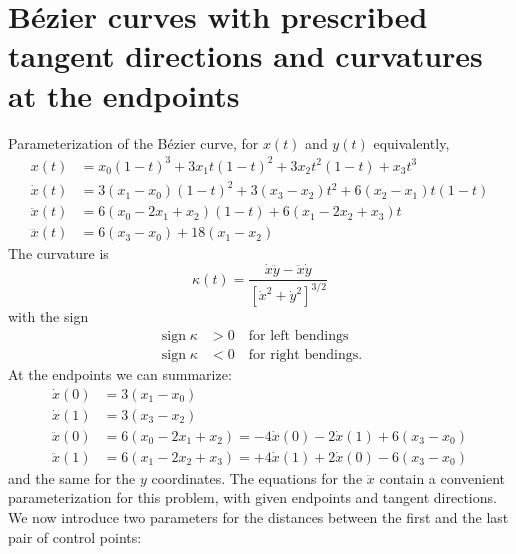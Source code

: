 \documentclass{article}
\newcommand{\sign}{\operatorname{sign}}
\begin{document}
\section{B\'ezier curves with prescribed tangent directions and curvatures at the endpoints}

Parameterization of the B\'ezier curve, for $x(t)$ and $y(t)$ equivalently,
%
\begin{align}
  x(t) &= x_0(1-t)^3 + 3x_1t(1-t)^2 + 3x_2t^2(1-t) + x_3 t^3\\
  \dot x(t) &= 3(x_1-x_0)(1-t)^2 + 3(x_3-x_2)t^2 + 6(x_2-x_1)t(1-t) \\
  \ddot x(t) &= 6(x_0 - 2x_1 + x_2)(1-t) + 6(x_1-2x_2+x_3) t \\
  \dddot x(t) &= 6(x_3-x_0) + 18(x_1-x_2)
\end{align}
%
The curvature is
\begin{equation}
  \kappa(t) = \frac{\dot x\ddot y - \ddot x\dot y}{[\dot x^2 + \dot y^2]^{3/2}}
\end{equation}
%
with the sign
%
\begin{equation}
  \begin{aligned}
    \sign\kappa &> 0 \quad\text{for left bendings}\\
    \sign\kappa &< 0 \quad\text{for right bendings.}
  \end{aligned}
\end{equation}
%
At the endpoints we can summarize:
%
\begin{align}
  \dot x(0)  &= 3(x_1 - x_0) \\
  \dot x(1)  &= 3(x_3 - x_2) \\
  \ddot x(0) &= 6(x_0 - 2x_1 + x_2) = -4\dot x(0) - 2\dot x(1) + 6(x_3 - x_0) \\
  \ddot x(1) &= 6(x_1 - 2x_2 + x_3) = +4\dot x(1) + 2\dot x(0) - 6(x_3 - x_0)
\end{align}
%
and the same for the $y$ coordinates.
The equations for the $\ddot x$ contain a convenient parameterization for this
problem, with given endpoints and tangent directions. We now introduce two
parameters for the distances between the first and the last pair of control
points:
%
\begingroup
\arraycolsep=0pt
\end{document}
